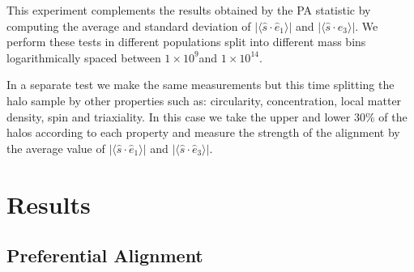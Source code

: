 \documentclass[useAMS,usenatbib]{mn2e}
\newcommand{\hMsun}{{\ifmmode{h^{-1}{\rm
        {M_{\odot}}}}\else{$h^{-1}{\rm{M_{\odot}}}$~}\fi}}
\begin{document}
This experiment complements the results obtained by the PA statistic by
computing the average and standard deviation of
$\vert\langle\hat{s}\cdot\hat{e}_1\rangle\vert$ and
$\vert\langle\hat{s}\cdot\hat{e}_3\rangle\vert$.  We perform these
tests in different populations split into different mass bins
logarithmically spaced between $1\times 10^{9}$\hMsun and
$1\times10^{14}$\hMsun. 

In a separate test we make the same measurements but this time
splitting the halo sample by other properties such as:
circularity, concentration, local matter density, spin and
triaxiality. In this case we take the upper and lower $30\%$ of the
halos according to each property and measure the strength of the
alignment by the average value of
$\vert\langle\hat{s}\cdot\hat{e}_1\rangle\vert$ and
$\vert\langle\hat{s}\cdot\hat{e}_3\rangle\vert$.

\section{Results}
\label{sec:results}


\subsection{Preferential Alignment}
\end{document}
